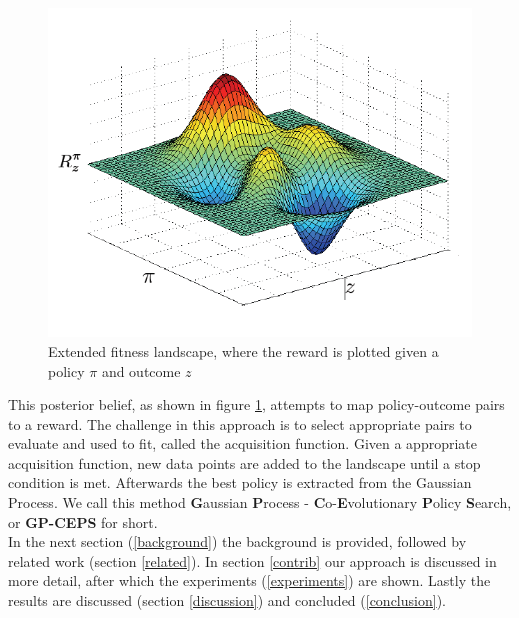 \begin{figure}[ht]
  \centering
  \includegraphics[scale=0.5]{images/fitness-landscape.png}
  \caption{Extended fitness landscape, where the reward is plotted given a policy $\pi$ and outcome $z$}\label{fitnesslandscape}
\end{figure}

This posterior belief, as shown in figure \ref{fitnesslandscape}, attempts to map policy-outcome pairs to a reward. The challenge in this approach is to select appropriate pairs to evaluate and used to fit, called the acquisition function. Given a appropriate acquisition function, new data points are added to the landscape until a stop condition is met. Afterwards the best policy is extracted from the Gaussian Process. We call this method \textbf{G}aussian \textbf{P}rocess - \textbf{C}o-\textbf{E}volutionary \textbf{P}olicy \textbf{S}earch, or \textbf{GP-CEPS} for short.\\

In the next section (\ref{background}) the background is provided, followed by related work (section \ref{related}). In section \ref{contrib} our approach is discussed in more detail, after which the experiments (\ref{experiments}) are shown. Lastly the results are discussed (section \ref{discussion}) and concluded (\ref{conclusion}).


